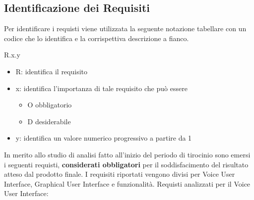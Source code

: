 \subsection{Identificazione dei Requisiti}
\label{indentificazione-requisiti}
Per identificare i requisti viene utilizzata la seguente notazione tabellare con un codice che lo identifica e la corrispettiva descrizione a fianco.
\begin{center}
    R.x.y
\end{center}
\begin{itemize}
    \item R: identifica il requisito
    \item x: identifica l'importanza di tale requisito che può essere
        \begin{itemize}
            \item O obbligatorio
            \item D desiderabile
        \end{itemize}
    \item y: identifica un valore numerico progressivo a partire da 1
\end{itemize}
In merito allo studio di analisi fatto all'inizio del periodo di tirocinio sono emersi i seguenti requisti, \textbf{considerati obbligatori} per il soddisfacimento del risultato atteso dal prodotto finale. I requisiti riportati vengono divisi per Voice User Interface, Graphical User Interface e funzionalità.
\newpage
\noindent Requisti analizzati per il Voice User Interface:
